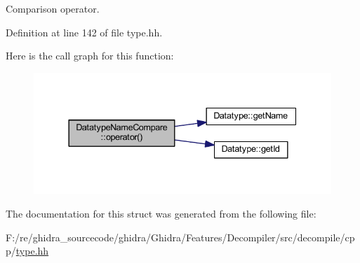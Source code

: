 Comparison operator. 



Definition at line 142 of file type.\+hh.

Here is the call graph for this function\+:
\nopagebreak
\begin{figure}[H]
\begin{center}
\leavevmode
\includegraphics[width=337pt]{struct_datatype_name_compare_a07af5044274609520e6ad8bae096671c_cgraph}
\end{center}
\end{figure}


The documentation for this struct was generated from the following file\+:\begin{DoxyCompactItemize}
\item 
F\+:/re/ghidra\+\_\+sourcecode/ghidra/\+Ghidra/\+Features/\+Decompiler/src/decompile/cpp/\mbox{\hyperlink{type_8hh}{type.\+hh}}\end{DoxyCompactItemize}
